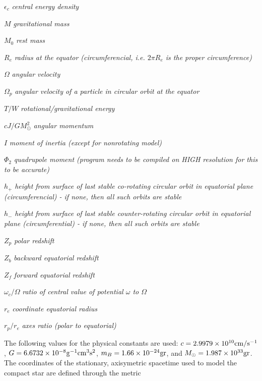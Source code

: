 \begin{description}

\item{ $\epsilon_c$ {\it central energy density}}
\item{ $M$ {\it gravitational mass}}
\item{ $M_0$ {\it rest mass}}
\item{ $R_e$ {\it radius at the equator (circumferencial, i.e. $2 \pi R_e$ is 
the proper circumference) }}
\item{ $\Omega$ {\it angular velocity}}
\item{ $\Omega_p$ {\it angular velocity of a particle in circular orbit 
                      at the equator}}
\item{ $T/W$ {\it rotational/gravitational energy}}
\item{ $cJ/GM_{\odot}^2$ {\it angular momentum}}
\item{ $I$ {\it moment of inertia (except for nonrotating model)}}
\item{ $\Phi_2$ {\it quadrupole moment (program needs to be compiled
	on HIGH resolution for this to be accurate)}}
\item{ $h_+$ {\it height from surface of last stable co-rotating circular 
               orbit in equatorial plane (circumferencial) - if none, then all 
              such orbits are stable}}
\item{ $h_-$ {\it height from surface of last stable counter-rotating circular 
               orbit in equatorial plane (circumferential) - if none, then all 
               such orbits are stable}}
\item{ $Z_p$ {\it polar redshift}}
\item{ $Z_b$ {\it backward equatorial redshift}}
\item{ $Z_f$ {\it forward equatorial redshift}}
\item{ $\omega_c/ \Omega$ {\it ratio of central value of potential $\omega$ to 
                             $\Omega$}}
\item{ $r_e$ {\it coordinate equatorial radius }}
\item{ $r_p/r_e$ {\it axes ratio (polar to equatorial)}}

\end{description} 

\<The following values for the physical constants are used: $c=2.9979 \times
10^{10} {\rm cm/s^{-1}}$, $G=6.6732 \times 10^{-8} {\rm g^{-1} cm^3 s^2}$, 
$m_B=1.66 \times 10^{-24} {\rm gr}$, and $M_{\odot}=1.987 \times 10^{33}
{\rm gr}$.
The coordinates of the stationary, axisymetric spacetime used to model the 
compact star are defined through the metric


